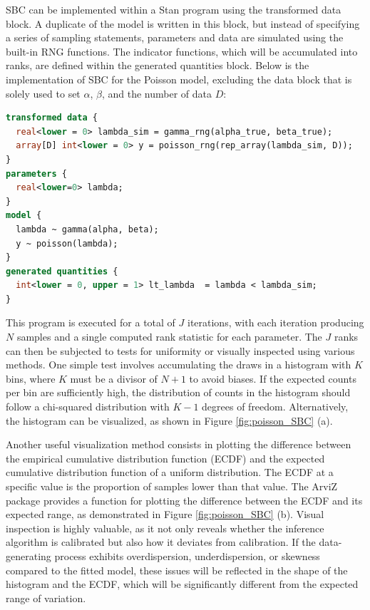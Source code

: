 SBC can be implemented within a Stan program using the transformed data block. A duplicate of the model is written in
this block, but instead of specifying a series of sampling statements, parameters and data are simulated using the
built-in RNG functions. The indicator functions, which will be accumulated into ranks, are defined within the generated
quantities block. Below is the implementation of SBC for the Poisson model, excluding the data block that is solely used
to set $\alpha$, $\beta$, and the number of data $D$:
\newpage
\begin{lstlisting}[language=Stan]
transformed data {
  real<lower = 0> lambda_sim = gamma_rng(alpha_true, beta_true);
  array[D] int<lower = 0> y = poisson_rng(rep_array(lambda_sim, D));
}
parameters {
  real<lower=0> lambda;
}
model {
  lambda ~ gamma(alpha, beta);
  y ~ poisson(lambda);
}
generated quantities {
  int<lower = 0, upper = 1> lt_lambda  = lambda < lambda_sim;
}
\end{lstlisting}
This program is executed for a total of $J$ iterations, with each iteration producing $N$ samples and a single computed
rank statistic for each parameter. %
The $J$ ranks can then be subjected to tests for uniformity or visually inspected using various methods. One simple
test involves accumulating the draws in a histogram with $K$ bins, where $K$ must be a divisor of $N+1$ to avoid
biases. If the expected counts per bin are sufficiently high, the distribution of counts in the histogram should follow
a chi-squared distribution with $K-1$ degrees of freedom. Alternatively, the histogram can be visualized, as shown in Figure \ref{fig:poisson_SBC} (a).

Another useful visualization method consists in plotting the difference between the empirical cumulative distribution
function (ECDF) and the expected cumulative distribution function of a uniform distribution. The ECDF at a specific
value is the proportion of samples lower than that value. The ArviZ package provides a function for plotting the
difference between the ECDF and its expected range, as demonstrated in Figure \ref{fig:poisson_SBC} (b). Visual
inspection is highly valuable, as it not only reveals whether the inference algorithm is calibrated but also how it
deviates from calibration. If the data-generating process exhibits overdispersion, underdispersion, or skewness
compared to the fitted model, these issues will be reflected in the shape of the histogram and the ECDF, which will be
significantly different from the expected range of variation.




